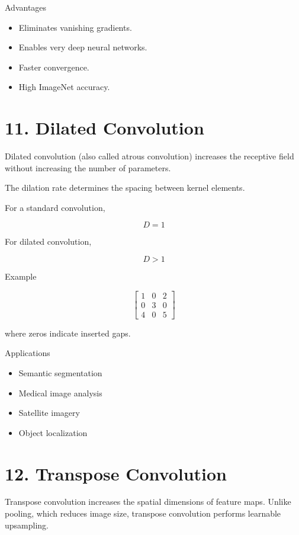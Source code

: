 \documentclass[11pt]{article}
\begin{document}
Advantages

\begin{itemize}
\item Eliminates vanishing gradients.
\item Enables very deep neural networks.
\item Faster convergence.
\item High ImageNet accuracy.
\end{itemize}


\section*{11. Dilated Convolution}

Dilated convolution (also called atrous convolution) increases the
receptive field without increasing the number of parameters.

The dilation rate determines the spacing between kernel elements.

For a standard convolution,

\[
D=1
\]

For dilated convolution,

\[
D>1
\]

Example

\[
\begin{bmatrix}
1 & 0 & 2\\
0 & 3 & 0\\
4 & 0 & 5
\end{bmatrix}
\]

where zeros indicate inserted gaps.

Applications

\begin{itemize}
\item Semantic segmentation
\item Medical image analysis
\item Satellite imagery
\item Object localization
\end{itemize}


\section*{12. Transpose Convolution}

Transpose convolution increases the spatial dimensions of feature maps.
Unlike pooling, which reduces image size, transpose convolution performs
learnable upsampling.
\end{document}
